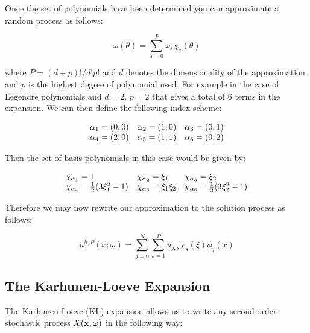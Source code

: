 Once the set of polynomials have been determined you can approximate a random
process as follows:

\begin{equation}
    \omega(\theta) = \sum_{s=0}^P\omega_s\chi_s(\theta)
\end{equation}

where $P = (d + p)!/d!p!$ and $d$ denotes the dimensionality of the
approximation and $p$ is the highest degree of polynomial used. For example in
the case of Legendre polynomials and $d=2$, $p=2$ that gives a total of 6
terms in the expansion. We can then define the following index scheme:

\begin{equation}
  \begin{array}{c c c }
    \alpha_1 = (0,0) & \alpha_2 = (1,0) & \alpha_3 = (0,1) \\
    \alpha_4 = (2,0) & \alpha_5 = (1,1) & \alpha_6 = (0,2)
  \end{array}
\end{equation}

Then the set of basis polynomials in this case would be given by:

\begin{equation}
  \begin{array}{l l l}
    \chi_{\alpha_1} = 1 & \chi_{\alpha_2} = \xi_1 & \chi_{\alpha_3} = \xi_2 \\
    \chi_{\alpha_4} = \frac{1}{2}(3\xi_1^2 - 1) &
    \chi_{\alpha_5} = \xi_1\xi_2 &
    \chi_{\alpha_6} = \frac{1}{2}(3\xi_2^2 - 1)
  \end{array}
\end{equation}


Therefore we may now rewrite our approximation to the solution process
 as follows:

\begin{equation}\label{eq:oned-stochastic-uhp}
    u^{h,P}(x;\omega) = \sum_{j=0}^N\sum_{s=1}^Pu_{j,s}\chi_s(\xi)\phi_j(x)
\end{equation}

\subsection{The Karhunen-Loeve Expansion}\label{sec:oned-stochastic-kl-expansion}

The Karhunen-Loeve (KL) expansion allows us to write any second order
stochastic process $X(\mathbf{x},\omega)$ in the following way:

